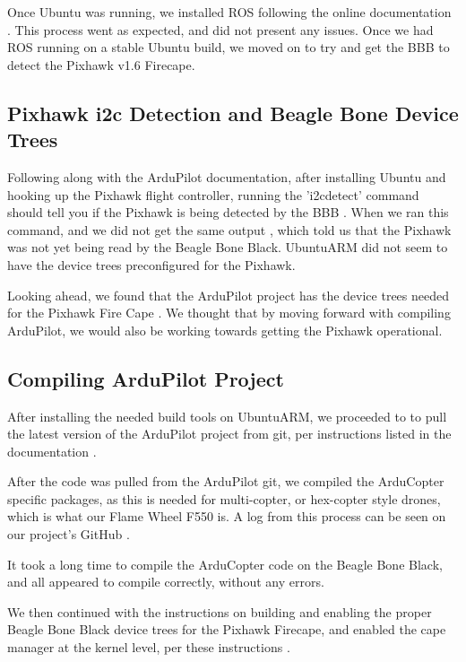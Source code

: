 \documentclass[IEEEtran,letterpaper,10pt,notitlepage,draftclsnofoot]{article}
\begin{document}
Once Ubuntu was running, we installed ROS following the online documentation \cite{ROSUbuntuARM}. This process went as expected, and did not present any issues. Once we had ROS running on a stable
Ubuntu build, we moved on to try and get the BBB to detect the Pixhawk v1.6 Firecape.


\subsection{Pixhawk i2c Detection and Beagle Bone Device Trees}

Following along with the ArduPilot documentation, after installing Ubuntu and hooking up the Pixhawk
flight controller, running the 'i2cdetect' command should tell you if the Pixhawk is being detected
by the BBB \cite{PixhawkDetectionArdu}.
When we ran this command, and we did not get the same output \cite{PixhawkDetectLog}, which
told us that the Pixhawk was not yet being read by the Beagle Bone Black. UbuntuARM did not seem to have the
device trees preconfigured for the Pixhawk.

Looking ahead, we found that the ArduPilot project has the device trees needed for the Pixhawk Fire Cape
\cite{ArduGuideDeviceTrees}. We thought that by moving forward with compiling ArduPilot, we would also be working towards getting the Pixhawk operational.


\subsection{Compiling ArduPilot Project}

After installing the needed build tools on UbuntuARM, we proceeded to to pull the latest version of the
ArduPilot project from git, per instructions listed in the documentation \cite{ArduCompileBBB}.

After the code was pulled from the ArduPilot git, we compiled the ArduCopter specific packages, as this is
needed for multi-copter, or hex-copter style drones, which is what our Flame Wheel F550 is. A log from this process can be
seen on our project's GitHub \cite{ArduCompileLog}.

It took a long time to compile the ArduCopter code on the Beagle Bone Black, and all appeared to compile
correctly, without any errors.

We then continued with the instructions on building and enabling the proper Beagle Bone Black device trees
for the Pixhawk Firecape, and enabled the cape manager at the kernel level, per these instructions \cite{ArduGuideDeviceTrees}.
\end{document}
